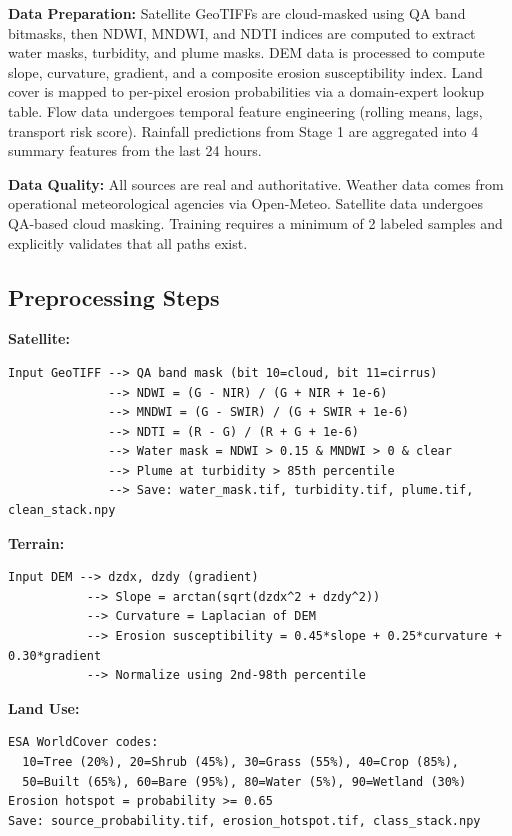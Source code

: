 \documentclass[twocolumn]{article}
\begin{document}
\textbf{Data Preparation:}
Satellite GeoTIFFs are cloud-masked using QA band bitmasks, then NDWI, MNDWI, and NDTI indices are computed to extract water masks, turbidity, and plume masks. DEM data is processed to compute slope, curvature, gradient, and a composite erosion susceptibility index. Land cover is mapped to per-pixel erosion probabilities via a domain-expert lookup table. Flow data undergoes temporal feature engineering (rolling means, lags, transport risk score). Rainfall predictions from Stage 1 are aggregated into 4 summary features from the last 24 hours.

\textbf{Data Quality:}
All sources are real and authoritative. Weather data comes from operational meteorological agencies via Open-Meteo. Satellite data undergoes QA-based cloud masking. Training requires a minimum of 2 labeled samples and explicitly validates that all paths exist.

\subsection{Preprocessing Steps}

\textbf{Satellite:}
\begin{verbatim}
Input GeoTIFF --> QA band mask (bit 10=cloud, bit 11=cirrus)
              --> NDWI = (G - NIR) / (G + NIR + 1e-6)
              --> MNDWI = (G - SWIR) / (G + SWIR + 1e-6)
              --> NDTI = (R - G) / (R + G + 1e-6)
              --> Water mask = NDWI > 0.15 & MNDWI > 0 & clear
              --> Plume at turbidity > 85th percentile
              --> Save: water_mask.tif, turbidity.tif, plume.tif, clean_stack.npy
\end{verbatim}

\textbf{Terrain:}
\begin{verbatim}
Input DEM --> dzdx, dzdy (gradient)
           --> Slope = arctan(sqrt(dzdx^2 + dzdy^2))
           --> Curvature = Laplacian of DEM
           --> Erosion susceptibility = 0.45*slope + 0.25*curvature + 0.30*gradient
           --> Normalize using 2nd-98th percentile
\end{verbatim}

\textbf{Land Use:}
\begin{verbatim}
ESA WorldCover codes:
  10=Tree (20%), 20=Shrub (45%), 30=Grass (55%), 40=Crop (85%),
  50=Built (65%), 60=Bare (95%), 80=Water (5%), 90=Wetland (30%)
Erosion hotspot = probability >= 0.65
Save: source_probability.tif, erosion_hotspot.tif, class_stack.npy
\end{verbatim}
\end{document}
